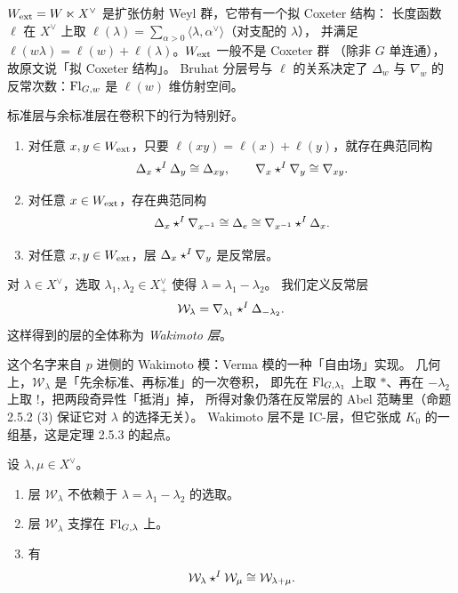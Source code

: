 \begin{yizhu}
$W_{\mathrm{ext}}=W\ltimes X^\vee$ 是扩张仿射 Weyl 群，它带有一个拟 Coxeter 结构：
长度函数 $\ell$ 在 $X^\vee$ 上取 $\ell(\lambda)=\sum_{\alpha>0}\langle\lambda,\alpha^\vee\rangle$（对支配的 $\lambda$），
并满足 $\ell(w\lambda)=\ell(w)+\ell(\lambda)$。$W_{\mathrm{ext}}$ 一般不是 Coxeter 群
（除非 $G$ 单连通），故原文说「拟 Coxeter 结构」。
Bruhat 分层号与 $\ell$ 的关系决定了 $\Delta_w$ 与 $\nabla_w$ 的反常次数：$\mathrm{Fl}_{G,w}$ 是 $\ell(w)$ 维仿射空间。
\end{yizhu}

标准层与余标准层在卷积下的行为特别好。

\begin{proposition}\label{prop:wak1}
\begin{enumerate}[label=(\arabic*),leftmargin=2.2em,itemsep=1pt]
\item 对任意 $x,y\in W_{\mathrm{ext}}$，只要 $\ell(xy)=\ell(x)+\ell(y)$，就存在典范同构
      \[
      \Delta_x\star^{I}\Delta_y\cong\Delta_{xy},
      \qquad
      \nabla_x\star^{I}\nabla_y\cong\nabla_{xy}.
      \]
\item 对任意 $x\in W_{\mathrm{ext}}$，存在典范同构
      \[
      \Delta_x\star^{I}\nabla_{x^{-1}}\cong\Delta_e\cong\nabla_{x^{-1}}\star^{I}\Delta_x .
      \]
\item 对任意 $x,y\in W_{\mathrm{ext}}$，层 $\Delta_x\star^{I}\nabla_y$ 是反常层。
\end{enumerate}
\end{proposition}

对 $\lambda\in X^\vee$，选取 $\lambda_1,\lambda_2\in X^\vee_+$ 使得 $\lambda=\lambda_1-\lambda_2$。
我们定义反常层
\[
\mathcal{W}_\lambda=\nabla_{\lambda_1}\star^{I}\Delta_{-\lambda_2}.
\]
这样得到的层的全体称为 \emph{Wakimoto 层}。

\begin{yizhu}
这个名字来自 $p$ 进侧的 Wakimoto 模：Verma 模的一种「自由场」实现。
几何上，$\mathcal{W}_\lambda$ 是「先余标准、再标准」的一次卷积，
即先在 $\mathrm{Fl}_{G,\lambda_1}$ 上取 $*$、再在 $-\lambda_2$ 上取 $!$，把两段奇异性「抵消」掉，
所得对象仍落在反常层的 Abel 范畴里（命题 2.5.2 (3) 保证它对 $\lambda$ 的选择无关）。
Wakimoto 层不是 $\mathrm{IC}$-层，但它张成 $K_0$ 的一组基，这是定理 2.5.3 的起点。
\end{yizhu}

\begin{proposition}[Mirkovi\'c]\label{prop:wak2}
设 $\lambda,\mu\in X^\vee$。
\begin{enumerate}[label=(\arabic*),leftmargin=2.2em,itemsep=1pt]
\item 层 $\mathcal{W}_\lambda$ 不依赖于 $\lambda=\lambda_1-\lambda_2$ 的选取。
\item 层 $\mathcal{W}_\lambda$ 支撑在 $\mathrm{Fl}_{G,\lambda}$ 上。
\item 有
      \[
      \mathcal{W}_\lambda\star^{I}\mathcal{W}_\mu\cong\mathcal{W}_{\lambda+\mu}.
      \]
\end{enumerate}
\end{proposition}

